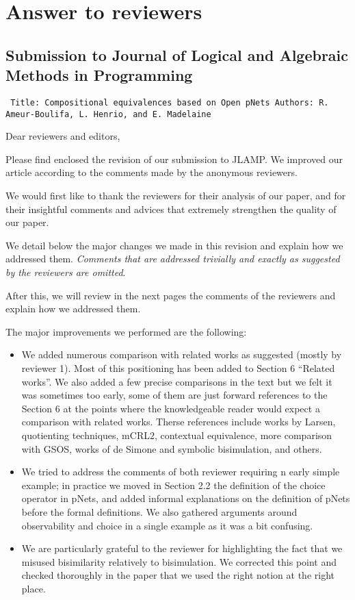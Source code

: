 \documentclass[10pt]{article}
\newenvironment{ttbox}{\begin{alltt}\small\tt}%
                      {\end{alltt}}
\begin{document}
\section*{Answer to reviewers }
\subsection*{Submission to Journal of Logical and Algebraic Methods in Programming}
\medskip
\begin{ttbox}
Title: Compositional equivalences based on Open pNets
Authors: R. Ameur-Boulifa, L. Henrio, and E. Madelaine
\end{ttbox}
\bigskip
Dear reviewers and editors,

Please find enclosed the revision of our submission to JLAMP. We improved our article according to the comments made by the
anonymous reviewers.

We would first like to thank the reviewers for their analysis of our
paper, and for their insightful comments and advices that extremely strengthen the quality of our paper.

We detail below the major changes we made in this revision and explain how we addressed them.  \emph{Comments that are  addressed trivially and exactly as suggested by the reviewers are omitted}.  

After this, we will review in the next pages the comments of the reviewers and explain how we addressed them. 

The major improvements we performed are the following:
\begin{itemize}
\item We added numerous comparison with related works as suggested (mostly by reviewer 1). 
Most of this positioning has been added to Section 6 ``Related works''. 
We also added a few precise comparisons in the text but we felt it was sometimes too  early, some of them are just forward references to the Section 6 at the points where the knowledgeable reader would expect a comparison with related works. Therse references include works by Larsen, quotienting techniques, mCRL2, contextual equivalence, more comparison with GSOS, works of de Simone and symbolic bisimulation, and others.
\item We tried to address the comments of both reviewer requiring n early simple example; in practice we moved in Section  2.2 the definition of the choice operator in pNets, and added informal explanations on the definition of pNets before the formal definitions. We also gathered arguments around observability and choice in a single example as it was a bit confusing.
\item We are particularly grateful to the reviewer for highlighting the fact that we misused bisimilarity relatively to bisimulation. We corrected this point and checked thoroughly in the paper that we used the right notion at the right place.
\end{itemize}
\end{document}
